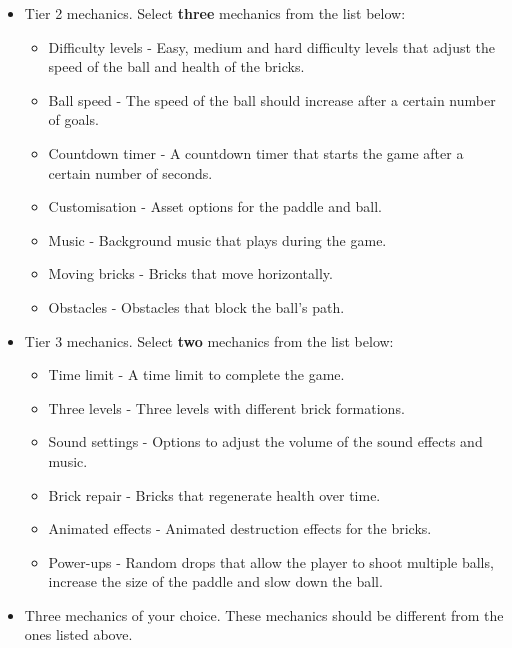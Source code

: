 \documentclass{article}
\begin{document}
\begin{itemize}
    \item Tier 2 mechanics. Select \textbf{three} mechanics from the list below:
    \begin{itemize}
        \item Difficulty levels - Easy, medium and hard difficulty levels that adjust the speed of the ball and health of the bricks.
        \item Ball speed - The speed of the ball should increase after a certain number of goals.
        \item Countdown timer - A countdown timer that starts the game after a certain number of seconds.
        \item Customisation - Asset options for the paddle and ball.
        \item Music - Background music that plays during the game.
        \item Moving bricks - Bricks that move horizontally.
        \item Obstacles - Obstacles that block the ball's path.
    \end{itemize}
    
    \item Tier 3 mechanics. Select \textbf{two} mechanics from the list below:
    \begin{itemize}
        \item Time limit - A time limit to complete the game.
        \item Three levels - Three levels with different brick formations.
        \item Sound settings - Options to adjust the volume of the sound effects and music.
        \item Brick repair - Bricks that regenerate health over time.
        \item Animated effects - Animated destruction effects for the bricks. 
        \item Power-ups - Random drops that allow the player to shoot multiple balls, increase the size of the paddle and slow down the ball.
    \end{itemize}
    \item Three mechanics of your choice. These mechanics should be different from the ones listed above.
\end{itemize}
\end{document}
